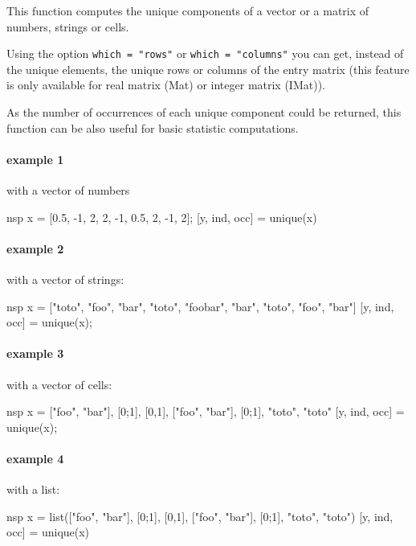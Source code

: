 \begin{mandescription}
  This function computes the unique components of a vector or a matrix of
  numbers, strings or cells.

  Using the option \verb+which = "rows"+ or \verb+which = "columns"+ you can
  get, instead of the unique elements, the unique rows or columns of the entry
  matrix (this feature is only available for real matrix (Mat) or integer matrix
  (IMat)).
  
  As the number of occurrences of each unique component could be returned, this
  function can be also useful for basic statistic computations.
\end{mandescription}
\begin{examples}
  \paragraph{example 1} with a vector of numbers
  \begin{mintednsp}{nsp}
    x = [0.5, -1, 2, 2, -1, 0.5, 2, -1, 2];
    [y, ind, occ] = unique(x)
  \end{mintednsp}

  \paragraph{example 2} with a vector of strings:
  \begin{mintednsp}{nsp}
    x = ["toto", "foo", "bar", "toto", "foobar", "bar", "toto", "foo", "bar"]
    [y, ind, occ] = unique(x);
  \end{mintednsp}

  \paragraph{example 3} with a vector of cells:
  \begin{mintednsp}{nsp}
    x = {["foo", "bar"], [0;1], [0,1], ["foo", "bar"], [0;1], {"toto"}, {"toto"}}
    [y, ind, occ] = unique(x);
\end{mintednsp}

\paragraph{example 4} with a list:
\begin{mintednsp}{nsp}
  x = list(["foo", "bar"], [0;1], [0,1], ["foo", "bar"], [0;1], "toto", "toto")
  [y, ind, occ] = unique(x)
\end{mintednsp}


\end{examples}
